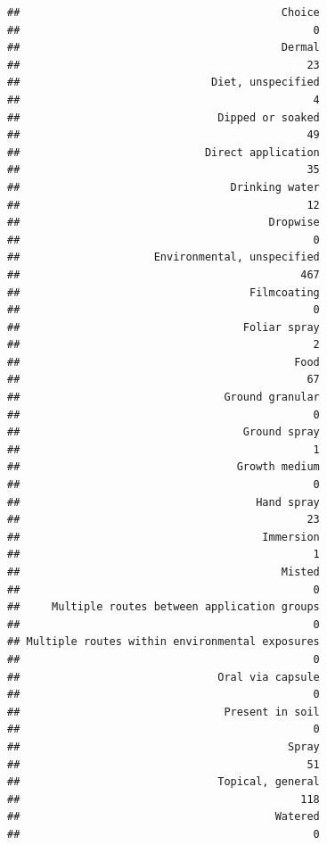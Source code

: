 \documentclass[
  12pt,
]{article}
\begin{document}
\begin{verbatim}
##                                         Choice 
##                                              0 
##                                         Dermal 
##                                             23 
##                              Diet, unspecified 
##                                              4 
##                               Dipped or soaked 
##                                             49 
##                             Direct application 
##                                             35 
##                                 Drinking water 
##                                             12 
##                                       Dropwise 
##                                              0 
##                     Environmental, unspecified 
##                                            467 
##                                    Filmcoating 
##                                              0 
##                                   Foliar spray 
##                                              2 
##                                           Food 
##                                             67 
##                                Ground granular 
##                                              0 
##                                   Ground spray 
##                                              1 
##                                  Growth medium 
##                                              0 
##                                     Hand spray 
##                                             23 
##                                      Immersion 
##                                              1 
##                                         Misted 
##                                              0 
##     Multiple routes between application groups 
##                                              0 
## Multiple routes within environmental exposures 
##                                              0 
##                               Oral via capsule 
##                                              0 
##                                Present in soil 
##                                              0 
##                                          Spray 
##                                             51 
##                               Topical, general 
##                                            118 
##                                        Watered 
##                                              0
\end{verbatim}
\end{document}
